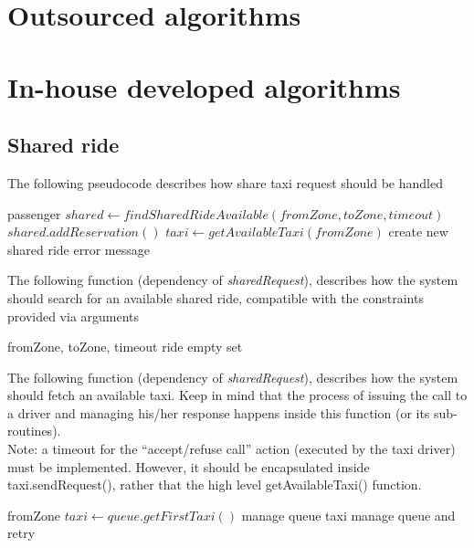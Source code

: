\section{Outsourced algorithms}

\section{In-house developed algorithms}

\subsection{Shared ride}
The following pseudocode describes how share taxi request should be handled
\begin{algorithmic}
  {passenger}
  \State $ shared \gets findSharedRideAvailable(fromZone, toZone, timeout) $
    \State $ shared.addReservation() $
  \Else
    \State $ taxi \gets getAvailableTaxi(fromZone) $
      \State create new shared ride
    \Else
      \State error message
    \EndIf
  \EndIf
 \EndFunction
\end{algorithmic}
\vspace{5mm}

The following function (dependency of \textit{sharedRequest}), describes how the system should search for an
available shared ride, compatible with the constraints provided via arguments
\begin{algorithmic}
  {fromZone, toZone, timeout}
	    \State \Return ride
	  \EndIf
	\EndIf
      \EndIf
    \EndIf
  \EndFor
  \State \Return empty set
 \EndFunction
\end{algorithmic}
\vspace{5mm}

The following function (dependency of \textit{sharedRequest}), describes how the system should fetch an available taxi.
Keep in mind that the process of issuing the call to a driver and managing his/her response happens inside this function
(or its sub-routines). \\
Note: a timeout for the ``accept/refuse call'' action (executed by the taxi driver) must be implemented. However, it
should be encapsulated inside taxi.sendRequest(), rather that the high level getAvailableTaxi() function.
\begin{algorithmic}
 {fromZone}
       \State $ taxi \gets queue.getFirstTaxi() $
         \State manage queue
         \Return taxi
     \Else 
         \State manage queue and retry
    \EndIf
\EndIf
\EndFor
\EndFunction


\end{algorithmic}

